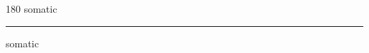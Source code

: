 
\begin{frame}
\begin{center}
\begin{turn}{180}
{\fontsize{2.5cm}{1em}\selectfont somatic}
\end{turn}
\vspace{1em}\par  
\hrule
\vspace{1em}\par  
{\fontsize{2.5cm}{1em}\selectfont somatic}
\end{center}
\end{frame}

